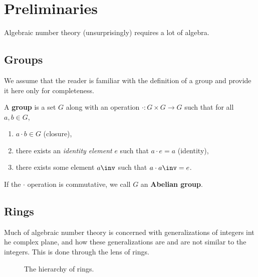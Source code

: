 \section{Preliminaries}

Algebraic number theory (unsurprisingly) requires a lot of algebra.

\subsection{Groups}

We assume that the reader is familiar with the definition of a group and provide it here only for completeness.

\begin{definition}[Group]
	A \textbf{group} is a set $G$ along with an operation $\cdot : G \times G \to G$ such that for all $a, b \in G$,
	\begin{enumerate}
		\item $a \cdot b \in G$ (closure),
		\item there exists an \emph{identity element} $e$ such that $a \cdot e = a$ (identity),
		\item there exists some element $a \inv$ such that $a \cdot a \inv = e$.
	\end{enumerate}
	If the $\cdot$ operation is commutative, we call $G$ an \textbf{Abelian group}.
\end{definition}

\subsection{Rings}

Much of algebraic number theory is concerned with generalizations of integers int he complex plane, and how these generalizations are and are not similar to the integers. This is done through the lens of rings.

\begin{figure}
	\centering
	\caption{The hierarchy of rings.} %
\end{figure}


